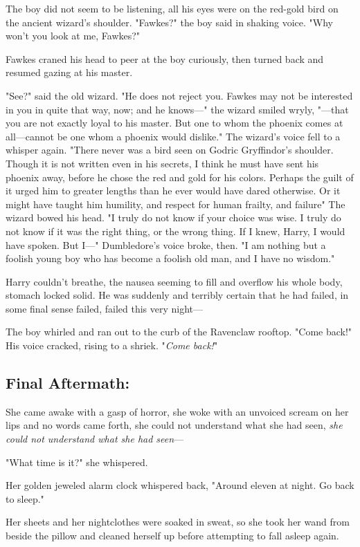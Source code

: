 The boy did not seem to be listening, all his eyes were on the red-gold bird on
the ancient wizard's shoulder. "Fawkes?" the boy said in shaking voice. "Why
won't you look at me, Fawkes?"

Fawkes craned his head to peer at the boy curiously, then turned back and
resumed gazing at his master.

"See?" said the old wizard. "He does not reject you. Fawkes may not be
interested in you in quite that way, now; and he knows—" the wizard smiled
wryly, "—that you are not exactly loyal to his master. But one to whom the
phoenix comes at all—cannot be one whom a phoenix would dislike." The
wizard's voice fell to a whisper again. "There never was a bird seen on Godric
Gryffindor's shoulder. Though it is not written even in his secrets, I think he
must have sent his phoenix away, before he chose the red and gold for his
colors. Perhaps the guilt of it urged him to greater lengths than he ever would
have dared otherwise. Or it might have taught him humility, and respect for
human frailty, and failure{\el}" The wizard bowed his head. "I truly do not
know if your choice was wise. I truly do not know if it was the right thing, or
the wrong thing. If I knew, Harry, I would have spoken. But I—" Dumbledore's
voice broke, then. "I am nothing but a foolish young boy who has become a
foolish old man, and I have no wisdom."

Harry couldn't breathe, the nausea seeming to fill and overflow his whole body,
stomach locked solid. He was suddenly and terribly certain that he had failed,
in some final sense failed, failed this very night—

The boy whirled and ran out to the curb of the Ravenclaw rooftop. "Come back!"
His voice cracked, rising to a shriek. "\emph{Come back!}"
\sbreak
\vspace{-2\baselineskip}
\subsection{Final Aftermath:}

She came awake with a gasp of horror, she woke with an unvoiced scream on her
lips and no words came forth, she could not understand what she had seen,
\emph{she could not understand what she had seen}—

"What time is it?" she whispered.

Her golden jeweled alarm clock whispered back, "Around eleven at night. Go back
to sleep."

Her sheets and her nightclothes were soaked in sweat, so she took her
wand from beside the pillow and cleaned herself up before attempting
to fall asleep again.

